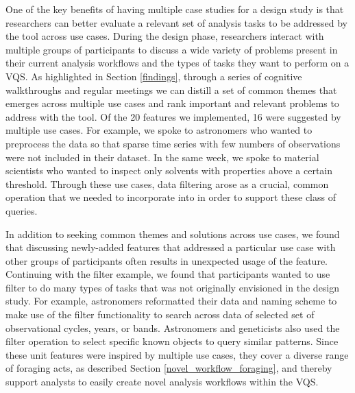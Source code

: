 {
\npar One of the key benefits of having multiple case studies for a design study is that researchers can better evaluate a relevant set of analysis tasks to be addressed by the tool across use cases. During the design phase, researchers interact with multiple groups of participants to discuss a wide variety of problems present in their current analysis workflows and the types of tasks they want to perform on a VQS. As highlighted in Section \ref{findings}, through a series of cognitive walkthroughs and regular meetings we can distill a set of common themes that emerges across multiple use cases and rank important and relevant problems to address with the tool. Of the 20 features we implemented, 16 were suggested by multiple use cases. 
\npar For example, we spoke to astronomers who wanted to preprocess the data so that sparse time series with few numbers of observations were not included in their dataset. In the same week, we spoke to material scientists who wanted to inspect only solvents with properties above a certain threshold. Through these use cases, data filtering arose as a crucial, common operation that we needed to incorporate into \zv in order to support these class of queries.

\npar In addition to seeking common themes and solutions across use cases, we found that discussing newly-added features that addressed a particular use case with other groups of participants often results in unexpected usage of the feature. Continuing with the filter example, we found that participants wanted to use filter to do many types of tasks that was not originally envisioned in the design study. For example, astronomers reformatted their data and naming scheme to make use of the filter functionality to search across data of selected set of observational cycles, years, or bands. Astronomers and geneticists also used the filter operation to select specific known objects to query similar patterns. Since these unit features were inspired by multiple use cases, they cover a diverse range of foraging acts, as described Section \ref{novel_workflow_foraging}, and thereby support analysts to easily create novel analysis workflows within the VQS.

}
